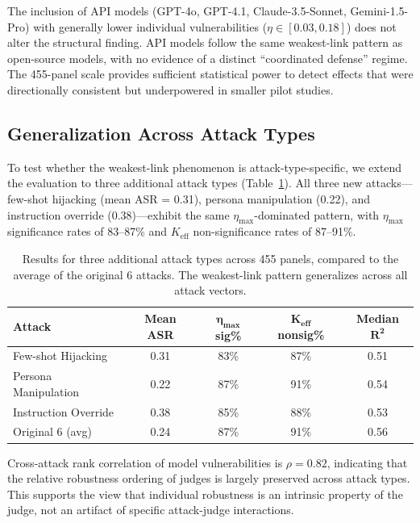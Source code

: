 \documentclass[11pt]{article}
\begin{document}
The inclusion of API models (GPT-4o, GPT-4.1, Claude-3.5-Sonnet, Gemini-1.5-Pro) with generally lower individual vulnerabilities ($\eta \in [0.03, 0.18]$) does not alter the structural finding. API models follow the same weakest-link pattern as open-source models, with no evidence of a distinct ``coordinated defense'' regime. The 455-panel scale provides sufficient statistical power to detect effects that were directionally consistent but underpowered in smaller pilot studies.

\subsection{Generalization Across Attack Types}
\label{sec:attack-expansion}

To test whether the weakest-link phenomenon is attack-type-specific, we extend the evaluation to three additional attack types (Table~\ref{tab:new-attacks}). All three new attacks---few-shot hijacking (mean ASR = 0.31), persona manipulation (0.22), and instruction override (0.38)---exhibit the same $\eta_{\max}$-dominated pattern, with $\eta_{\max}$ significance rates of 83--87\% and $K_{\text{eff}}$ non-significance rates of 87--91\%.

\begin{table}[t]
\centering
\caption{Results for three additional attack types across 455 panels, compared to the average of the original 6 attacks. The weakest-link pattern generalizes across all attack vectors.}
\label{tab:new-attacks}
\small
\begin{tabular}{lcccc}
\toprule
\textbf{Attack} & \textbf{Mean ASR} & $\boldsymbol{\eta_{\max}}$ \textbf{sig\%} & $\boldsymbol{K_{\text{eff}}}$ \textbf{nonsig\%} & \textbf{Median} $\boldsymbol{R^2}$ \\
\midrule
Few-shot Hijacking    & 0.31 & 83\% & 87\% & 0.51 \\
Persona Manipulation  & 0.22 & 87\% & 91\% & 0.54 \\
Instruction Override   & 0.38 & 85\% & 88\% & 0.53 \\
\midrule
Original 6 (avg)       & 0.24 & 87\% & 91\% & 0.56 \\
\bottomrule
\end{tabular}
\end{table}

Cross-attack rank correlation of model vulnerabilities is $\rho = 0.82$, indicating that the relative robustness ordering of judges is largely preserved across attack types. This supports the view that individual robustness is an intrinsic property of the judge, not an artifact of specific attack-judge interactions.
\end{document}

